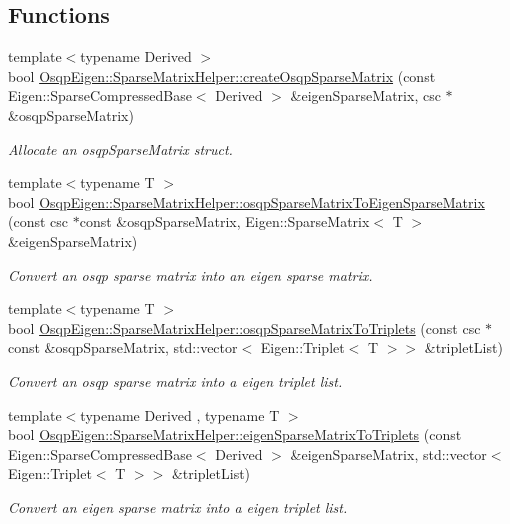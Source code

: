 \subsection*{Functions}
\begin{DoxyCompactItemize}
\item 
{\footnotesize template$<$typename Derived $>$ }\\bool \mbox{\hyperlink{namespaceOsqpEigen_1_1SparseMatrixHelper_a84479192d86e344f029d072a62c8217b}{Osqp\+Eigen\+::\+Sparse\+Matrix\+Helper\+::create\+Osqp\+Sparse\+Matrix}} (const Eigen\+::\+Sparse\+Compressed\+Base$<$ Derived $>$ \&eigen\+Sparse\+Matrix, csc $\ast$\&osqp\+Sparse\+Matrix)
\begin{DoxyCompactList}\small\item\em Allocate an osqp\+Sparse\+Matrix struct. \end{DoxyCompactList}\item 
{\footnotesize template$<$typename T $>$ }\\bool \mbox{\hyperlink{namespaceOsqpEigen_1_1SparseMatrixHelper_aec1a2210ce843eda8e4000c81d886131}{Osqp\+Eigen\+::\+Sparse\+Matrix\+Helper\+::osqp\+Sparse\+Matrix\+To\+Eigen\+Sparse\+Matrix}} (const csc $\ast$const \&osqp\+Sparse\+Matrix, Eigen\+::\+Sparse\+Matrix$<$ T $>$ \&eigen\+Sparse\+Matrix)
\begin{DoxyCompactList}\small\item\em Convert an osqp sparse matrix into an eigen sparse matrix. \end{DoxyCompactList}\item 
{\footnotesize template$<$typename T $>$ }\\bool \mbox{\hyperlink{namespaceOsqpEigen_1_1SparseMatrixHelper_af45a1d77519f691542150e506b6dcdeb}{Osqp\+Eigen\+::\+Sparse\+Matrix\+Helper\+::osqp\+Sparse\+Matrix\+To\+Triplets}} (const csc $\ast$const \&osqp\+Sparse\+Matrix, std\+::vector$<$ Eigen\+::\+Triplet$<$ T $>$$>$ \&triplet\+List)
\begin{DoxyCompactList}\small\item\em Convert an osqp sparse matrix into a eigen triplet list. \end{DoxyCompactList}\item 
{\footnotesize template$<$typename Derived , typename T $>$ }\\bool \mbox{\hyperlink{namespaceOsqpEigen_1_1SparseMatrixHelper_ae2383e6a41df66d2c34f61a8866af3e8}{Osqp\+Eigen\+::\+Sparse\+Matrix\+Helper\+::eigen\+Sparse\+Matrix\+To\+Triplets}} (const Eigen\+::\+Sparse\+Compressed\+Base$<$ Derived $>$ \&eigen\+Sparse\+Matrix, std\+::vector$<$ Eigen\+::\+Triplet$<$ T $>$$>$ \&triplet\+List)
\begin{DoxyCompactList}\small\item\em Convert an eigen sparse matrix into a eigen triplet list. \end{DoxyCompactList}\end{DoxyCompactItemize}


